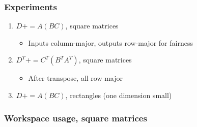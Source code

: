 \documentclass{beamer}
\newcommand*{\pluseq}{\mathrel{{+}{=}}}
\begin{document}
\begin{frame}
  \frametitle{Experiments}
  \begin{enumerate}
  \item $D \pluseq A(BC)$, square matrices
    \begin{itemize}
    \item Inputs column-major, outputs row-major for fairness
    \end{itemize}
  \item $D^T \pluseq C^T(B^TA^T)$, square matrices
    \begin{itemize}
    \item After transpose, all row major
    \end{itemize}
  \item $D \pluseq A(BC)$, rectangles (one dimension small)
  \end{enumerate}
\end{frame}

\begin{frame}
  \frametitle{Workspace usage, square matrices}
\end{frame}
\end{document}
